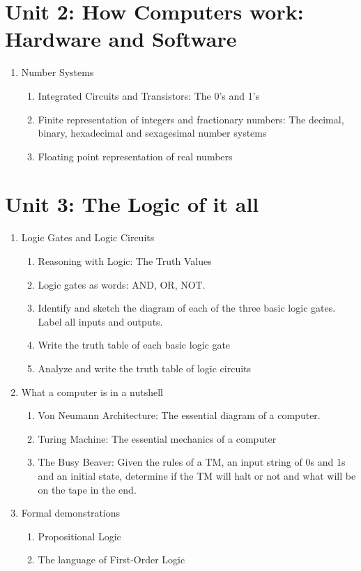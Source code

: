 \documentclass{report}
\begin{document}
\section{Unit 2: How Computers work: Hardware and Software }
\begin{enumerate}
\item Number Systems
	\begin{enumerate}
	\item Integrated Circuits and Transistors: The 0's and 1's
	\item Finite representation of integers and fractionary numbers: The decimal, binary, hexadecimal and sexagesimal number systems
	\item Floating point representation of real numbers
	\end{enumerate}
\end{enumerate}
\section{Unit 3: The Logic of it all }
\begin{enumerate}
\item Logic Gates and Logic Circuits
	\begin{enumerate}
	\item Reasoning with Logic: The Truth Values
	\item Logic gates as words: AND, OR, NOT.
	\item Identify and sketch the diagram of each of the three basic logic gates. Label all inputs and outputs.
	\item Write the truth table of each basic logic gate
	\item Analyze and write the truth table of logic circuits
	\end{enumerate}
\item What a computer is in a nutshell
	\begin{enumerate}
	\item Von Neumann Architecture: The essential diagram of a computer.
	\item Turing Machine: The essential mechanics of a computer 
	\item The Busy Beaver: Given the rules of a TM, an input string of 0s and 1s and an initial state,
	        determine if the TM will halt or not and what will be on the tape in the end.
	\end{enumerate}
\item Formal demonstrations
	\begin{enumerate}
	\item Propositional Logic
	\item The language of First-Order Logic
	\end{enumerate}
\end{enumerate}
\end{document}
